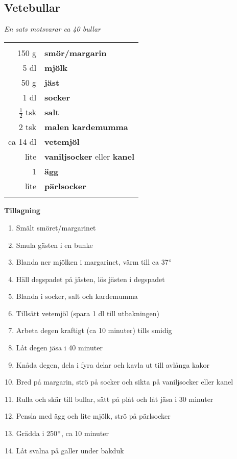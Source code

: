 \documentclass[a4paper,12pt]{article}
\newcommand{\sats}[1]{\noindent \textit{En sats motsvarar #1}}
\begin{document}
\clearpage

\subsection{Vetebullar}
\sats{ca 40 bullar}

\begin{table}[H]
	\begin{tabular}{rl}
	\hline
	&\\
		150 g & \textbf{smör/margarin}\\
		5 dl & \textbf{mjölk}\\
		50 g & \textbf{jäst}\\
		1 dl & \textbf{socker}\\
		$\frac{1}{2}$ tsk & \textbf{salt}\\
		2 tsk & \textbf{malen kardemumma}\\
		ca 14 dl & \textbf{vetemjöl}\\
		lite & \textbf{vaniljsocker} eller \textbf{kanel}\\
		1 & \textbf{ägg}\\
		lite & \textbf{pärlsocker}\\
	&\\
	\hline
	\end{tabular}
\end{table}

\begin{multicols*}{2}

\noindent \textbf{Tillagning}
\begin{enumerate}
	\itemsep0cm
	\item Smält smöret/margarinet
	\item Smula gästen i en bunke
	\item Blanda ner mjölken i marga\-rinet, värm till ca 37$\degree$
	\item Häll degspadet på jästen, lös jästen i degspadet
	\item	Blanda i socker, salt och kardemumma
	\item Tillsätt vetemjöl (spara 1 dl till utbakningen)
	\item Arbeta degen kraftigt (ca 10 minuter) tills smidig
	\item Låt degen jäsa i 40 minuter
	\item Knåda degen, dela i fyra delar och kavla ut till avlånga kakor
	\item Bred på margarin, strö på \mbox{socker} och sikta på vaniljsocker eller kanel
	\item Rulla och skär till bullar, sätt på plåt och låt jäsa i 30 \mbox{minuter}
	\item Pensla med ägg och lite mjölk, strö på pärlsocker
	\item Grädda i 250$\degree$, ca 10 minuter
	\item Låt svalna på galler under bakduk
\end{enumerate}

\end{multicols*}
\end{document}
